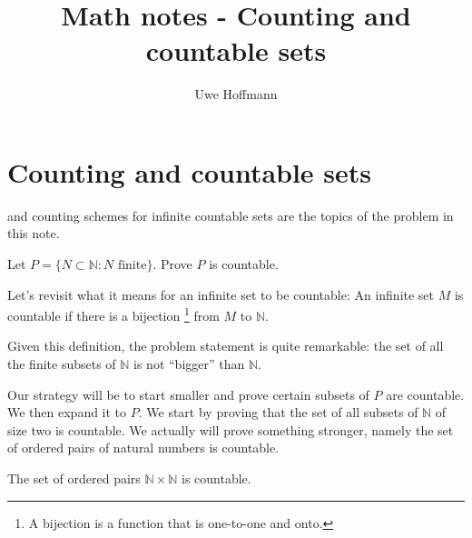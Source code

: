 

\title{Math notes - Counting and countable sets}
\author{Uwe Hoffmann}



\setcounter{chapter}{1}
\section*{Counting and countable sets}

 and counting schemes for infinite countable sets are the topics of the problem in this note. 

\vspace{10 mm}
\begin{problem}
Let $P = \{ N \subset \mathbb{N}: N \text{  finite}\}$. Prove $P$ is countable.	     
\end{problem}

Let's revisit what it means for an infinite set to be countable: An infinite set $M$ is countable if there is a bijection \footnote{A bijection is a function that is one-to-one and onto.} from $M$ to $\mathbb{N}$. 

Given this definition, the problem statement is quite remarkable: the set of all the finite subsets of $\mathbb{N}$ is not ``bigger'' than $\mathbb{N}$.
\newline

\noindent Our strategy will be to start smaller and prove certain subsets of $P$ are countable. We then expand it to $P$. We start by proving that the set of all subsets of $\mathbb{N}$ of size two is countable. We actually will prove something stronger, namely the set of ordered pairs of natural numbers is countable.

\begin{thm}\label{countingpairs}
The set of ordered pairs $\mathbb{N} \times \mathbb{N}$ is countable.
\end{thm}



